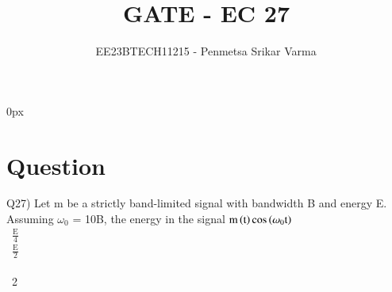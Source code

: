 \documentclass[beamer]{IEEEtran}
\theoremstyle{remark}
\begin{document}

\parindent 0px


\title{GATE - EC 27}
\author{EE23BTECH11215 - Penmetsa Srikar Varma$^{}$%
}
\maketitle
\newpage
\bigskip

\renewcommand{\thefigure}{\theenumi}
\renewcommand{\thetable}{\theenumi}
\section*{Question}
Q27) Let m be a strictly band-limited signal with bandwidth B and energy E. Assuming $\omega_0$ = 10B, the energy in the signal $\text{m}\left(\text{t}\right)\text{cos}\left(\omega_0\text{t}\right)$\\[1ex]
\ $\frac{\text{E}}{4}$\\[1ex]
\ $\frac{\text{E}}{2}$\\[1ex]
\ \\[1ex]
\ 2 \qquad\qquad\qquad\quad\qquad\qquad\qquad\qquad{}
\end{document}
